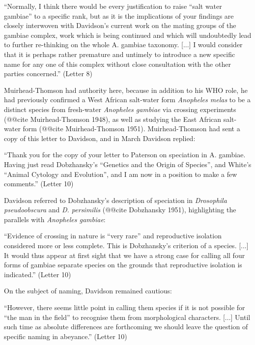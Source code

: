 \documentclass[a4paper,11pt,abstracton,hidelinks]{scrartcl}
\begin{document}
\begin{displayquote}
``Normally, I think there would be every justification to raise ``salt water gambiae'' to a specific rank, but as it is the implications of your findings are closely interwoven with Davidson's current work on the mating groups of the gambiae complex, work which is being continued and which will undoubtedly lead to further re-thinking on the whole A. gambiae taxonomy. [...] I would consider that it is perhaps rather premature and untimely to introduce a new specific name for any one of this complex without close consultation with the other parties concerned.'' (Letter 8)
\end{displayquote}

Muirhead-Thomson had authority here, because in addition to his WHO role, he had previously confirmed a West African salt-water form \textit{Anopheles melas} to be a distinct species from fresh-water \textit{Anopheles gambiae} via crossing experiments (@@cite Muirhead-Thomson 1948), as well as studying the East African salt-water form (@@cite Muirhead-Thomson 1951). Muirhead-Thomson had sent a copy of this letter to Davidson, and in March Davidson replied:

\begin{displayquote}
``Thank you for the copy of your letter to Paterson on speciation in A. gambiae. Having just read Dobzhansky's ``Genetics and the Origin of Species'', and White's ``Animal Cytology and Evolution'', and I am now in a position to make a few comments.'' (Letter 10)
\end{displayquote}

Davidson referred to Dobzhansky's description of speciation in \textit{Drosophila pseudoobscura} and \textit{D. persimilis} (@@cite Dobzhansky 1951), highlighting the parallels with \textit{Anopheles gambiae}:

\begin{displayquote}
``Evidence of crossing in nature is ``very rare'' and reproductive isolation considered more or less complete. This is Dobzhansky's criterion of a species. [...] It would thus appear at first sight that we have a strong case for calling all four forms of gambiae separate species on the grounds that reproductive isolation is indicated.'' (Letter 10)
\end{displayquote}

On the subject of naming, Davidson remained cautious:

\begin{displayquote}
``However, there seems little point in calling them species if it is not possible for ``the man in the field'' to recognise them from morphological characters. [...] Until such time as absolute differences are forthcoming we should leave the question of specific naming in abeyance.'' (Letter 10)
\end{displayquote}
\end{document}
